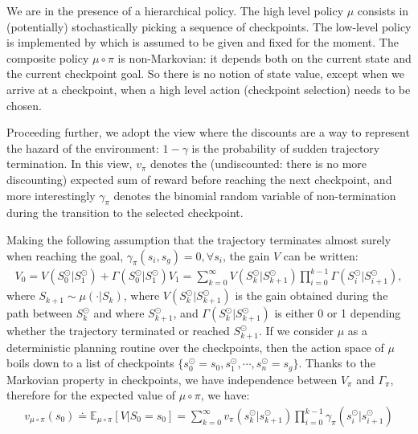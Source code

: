 We are in the presence of a hierarchical policy. The high level policy $\mu$ consists in (potentially) stochastically picking a sequence of checkpoints. The low-level policy is implemented by \red{$\pi$} which is assumed to be given and fixed for the moment. The composite policy $\mu\circ\pi$ is non-Markovian: it depends both on the current state and the current checkpoint goal. So there is no notion of state value, except when we arrive at a checkpoint, \ie{} when a high level action (checkpoint selection) needs to be chosen.

Proceeding further, we adopt the view where the discounts are a way to represent the hazard of the environment: $1 - \gamma$ is the probability of sudden trajectory termination. In this view, $v_\pi$ denotes the (undiscounted: there is no more discounting) expected sum of reward before reaching the next checkpoint, and more interestingly $\gamma_\pi$ denotes the binomial random variable of non-termination during the transition to the selected checkpoint.

Making the following assumption that the trajectory terminates almost surely when reaching the goal, \ie{} $\gamma_\pi(s_i,s_g)=0, \forall s_i$, 
the gain $V$ can be written:
\begin{align}
V_0 = V(S_0^{\odot}|S_1^{\odot})+\Gamma(S_0^{\odot}|S_1^{\odot}) V_1 =  \sum_{k=0}^\infty V(S_k^{\odot}|S_{k+1}^{\odot}) \prod_{i=0}^{k-1}\Gamma(S_i^{\odot}|S_{i+1}^{\odot}),
\end{align}
where $S_{k+1}\sim\mu(\cdot|S_k)$, where $V(S_k^{\odot}|S_{k+1}^{\odot})$ is the gain obtained during the path between $S_k^{\odot}$ and where $S_{k+1}^{\odot}$, and $\Gamma(S_k^{\odot}|S_{k+1}^{\odot})$ is either 0 or 1 depending whether the trajectory terminated or reached $S_{k+1}^{\odot}$. If we consider $\mu$ as a deterministic planning routine over the checkpoints, then the action space of $\mu$ boils down to a list of checkpoints $\{s^{\odot}_0=s_0, s^{\odot}_1, \cdots,s^{\odot}_n=s_g\}$. Thanks to the Markovian property in checkpoints, we have independence between $V_\pi$ and $\Gamma_\pi$, therefore for the expected value of $\mu\circ\pi$, we have:
\begin{align}
    v_{\mu\circ\pi}(s_0) \doteq \mathbb{E}_{\mu\circ\pi}[V|S_0=s_0]=  \sum_{k=0}^\infty v_\pi(s^{\odot}_k|s^{\odot}_{k+1}) \prod_{i=0}^{k-1}\gamma_\pi (s^{\odot}_i|s^{\odot}_{i+1})  
\end{align}


